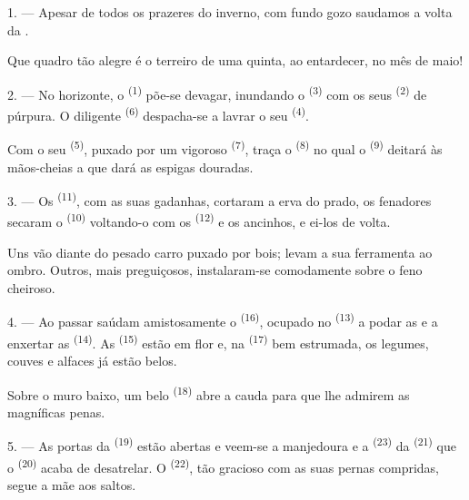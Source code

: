\VUsaut{3.0mm}
\VUsaut{3.0mm}

\VUsaut{4.0mm}

1. --- Apesar de todos os prazeres do inverno, com fundo gozo saudamos a
volta da .

Que quadro tão alegre é o terreiro de uma quinta, ao entardecer, no mês
de maio!

2. --- No horizonte, o  \textsuperscript{(1)} põe-se devagar, inundando
o  \textsuperscript{(3)} com os seus  \textsuperscript{(2)} de
púrpura. O diligente  \textsuperscript{(6)} despacha-se a lavrar o
seu  \textsuperscript{(4)}.

Com o seu  \textsuperscript{(5)}, puxado por um vigoroso
 \textsuperscript{(7)}, traça o  \textsuperscript{(8)} no qual
o  \textsuperscript{(9)} deitará às mãos-cheias a
 que dará as espigas douradas.

3. --- Os  \textsuperscript{(11)}, com as suas gadanhas, cortaram
a erva do prado, os fenadores secaram o  \textsuperscript{(10)}
voltando-o com os  \textsuperscript{(12)} e os ancinhos, e ei-los
de volta.

Uns vão diante do pesado carro puxado por bois; levam a sua ferramenta ao
ombro. Outros, mais preguiçosos, instalaram-se comodamente sobre o feno
cheiroso.

4. --- Ao passar saúdam amistosamente o 
\textsuperscript{(16)}, ocupado no  \textsuperscript{(13)} a podar as
 e a enxertar as 
\textsuperscript{(14)}. As  \textsuperscript{(15)} estão em flor e, na
 \textsuperscript{(17)} bem estrumada, os legumes, couves e alfaces
já estão belos.

Sobre o muro baixo, um belo  \textsuperscript{(18)} abre a cauda para
que lhe admirem as magníficas penas.

\VUsaut{3.0mm}

5. --- As portas da  \textsuperscript{(19)} estão abertas e
veem-se a manjedoura e a  \textsuperscript{(23)} da
 \textsuperscript{(21)} que o 
\textsuperscript{(20)} acaba de desatrelar. O  \textsuperscript{(22)}, tão
gracioso com as suas pernas compridas, segue a mãe aos saltos.


